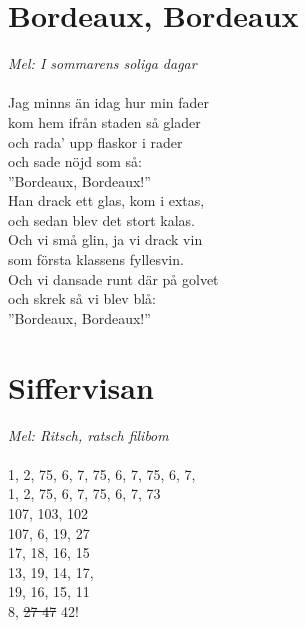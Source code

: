 \documentclass[a5paper,15pt]{article}
\begin{document}
\setcounter{section}{0}
\renewcommand{\thesection}{E\arabic{section}}


\section{Bordeaux, Bordeaux}
\emph{Mel: I sommarens soliga dagar}\\
\\
Jag minns än idag hur min fader\\
kom hem ifrån staden så glader\\
och rada’ upp flaskor i rader\\
och sade nöjd som så:\\
”Bordeaux, Bordeaux!”
\\
Han drack ett glas, kom i extas,\\
och sedan blev det stort kalas.\\
Och vi små glin, ja vi drack vin\\
som första klassens fyllesvin.\\
Och vi dansade runt där på golvet\\
och skrek så vi blev blå:\\
”Bordeaux, Bordeaux!”

\section{Siffervisan}
\emph{Mel: Ritsch, ratsch filibom}\\
\\
1, 2, 75, 6, 7, 75, 6, 7, 75, 6, 7,\\
1, 2, 75, 6, 7, 75, 6, 7, 73\\
107, 103, 102\\
107, 6, 19, 27\\
17, 18, 16, 15\\
13, 19, 14, 17,\\
19, 16, 15, 11\\
8, \sout{27 47} 42!
\\
\end{document}
